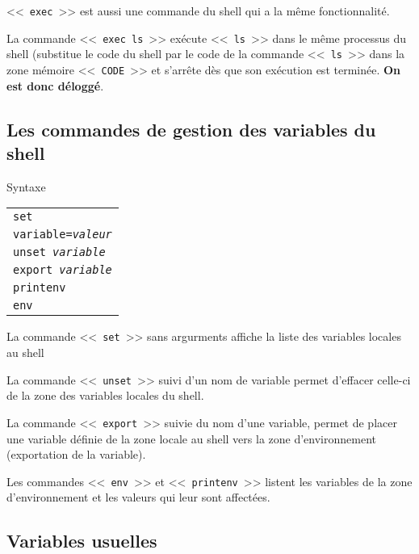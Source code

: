 \begin{remarque}
<<~\texttt{exec}~>> est aussi une commande du shell qui a la m{\^e}me fonctionnalit{\'e}.
\end{remarque}

La commande <<~\verb=exec ls=~>> ex{\'e}cute <<~\texttt{ls}~>> dans le m{\^e}me processus
du shell (substitue le code du shell par le code de la commande <<~\texttt{ls}~>>
dans la zone m{\'e}moire <<~\texttt{CODE}~>> et s'arr{\^e}te d{\`e}s que son ex{\'e}cution est
termin{\'e}e. {\bf On est donc d{\'e}logg{\'e}}.

\subsection{Les commandes de gestion des variables du shell}

\begin{definition}{Syntaxe}
\begin{tabular}{@{\hspace{1cm}}l}
	\texttt{set}\\[0.2cm]
	\texttt{variable=\textsl{valeur}}\\[0.2cm]
	\texttt{unset \textsl{variable}}\\[0.2cm]
	\texttt{export \textsl{variable}}\\[0.2cm]
	\texttt{printenv}\\[0.2cm]
	\texttt{env}\\
\end{tabular}
\end{definition}

La commande <<~\texttt{set}~>> sans argurments
affiche la liste des variables locales au shell

La commande <<~\texttt{unset}~>> suivi d'un nom de variable permet
d'effacer celle-ci de la zone des variables locales du shell.

La commande <<~\texttt{export}~>> suivie du nom d'une variable, permet de
placer une variable d{\'e}finie de la zone locale au shell vers la zone
d'environnement (exportation de la variable).

Les commandes <<~\texttt{env}~>> et
<<~\texttt{printenv}~>> listent les variables de la
zone d'environnement et les valeurs qui leur sont affect{\'e}es.

\subsection{Variables usuelles}

